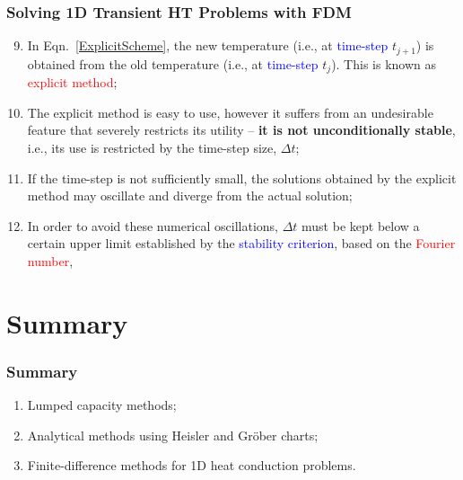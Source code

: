 \documentclass[10pt,compress,unknownkeysallowed]{beamer}
\newcommand{\frc}{\displaystyle\frac}
\newcommand{\red}{\textcolor{red}}
\newcommand{\blue}{\textcolor{blue}}
\begin{document}
\begin{frame}
  \frametitle{Solving 1D Transient HT Problems with FDM}
    \begin{enumerate}\setcounter{enumi}{8}
      \item<1-> In Eqn.~\ref{ExplicitScheme}, the new temperature (i.e., at \blue{time-step} $t_{j+1}$) is obtained from the old temperature  (i.e., at \blue{time-step} $t_{j}$). This is known as \red{explicit method}; 
      \item<2-> The explicit method is easy to use, however it suffers from an undesirable feature that severely restricts its utility -- {\bf it is not unconditionally stable}, i.e., its use is restricted by the time-step size, $\Delta t$;
      \item<3-> If the time-step is not sufficiently small, the solutions obtained by the explicit method may oscillate and diverge from the actual solution;
      \item<4-> In order to avoid these numerical oscillations, $\Delta t$ must be kept below a certain upper limit established by the \blue{stability criterion}, based on the \red{Fourier number},
           \visible<4->{\begin{equation}
               Fo = \frc{\alpha \Delta t}{\left(\Delta x\right)^{2}} \leq \frc{1}{2}
           \end{equation}} 

    \end{enumerate}
\end{frame}



\section{Summary} 


\begin{frame}
  \frametitle{Summary}
    \begin{enumerate}  
       \item Lumped capacity methods;  
       \item Analytical methods using Heisler and Gr\"ober charts;
       \item Finite-difference methods for 1D heat conduction problems.
    \end{enumerate}
\end{frame}
\end{document}
